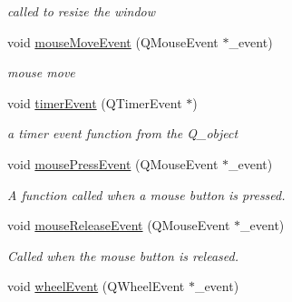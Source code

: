 \begin{DoxyCompactItemize}
\begin{DoxyCompactList}\small\item\em called to resize the window \end{DoxyCompactList}\item 
\hypertarget{class_open_g_l_widget_aa6d543f552c813df3b3a78dc5c4899fd}{void \hyperlink{class_open_g_l_widget_aa6d543f552c813df3b3a78dc5c4899fd}{mouse\-Move\-Event} (Q\-Mouse\-Event $\ast$\-\_\-event)}\label{class_open_g_l_widget_aa6d543f552c813df3b3a78dc5c4899fd}

\begin{DoxyCompactList}\small\item\em mouse move \end{DoxyCompactList}\item 
\hypertarget{class_open_g_l_widget_a11473cec64e843211458fd83f9d6ad72}{void \hyperlink{class_open_g_l_widget_a11473cec64e843211458fd83f9d6ad72}{timer\-Event} (Q\-Timer\-Event $\ast$)}\label{class_open_g_l_widget_a11473cec64e843211458fd83f9d6ad72}

\begin{DoxyCompactList}\small\item\em a timer event function from the Q\-\_\-object \end{DoxyCompactList}\item 
\hypertarget{class_open_g_l_widget_adaab83f0bed689b0765d42b6ae760220}{void \hyperlink{class_open_g_l_widget_adaab83f0bed689b0765d42b6ae760220}{mouse\-Press\-Event} (Q\-Mouse\-Event $\ast$\-\_\-event)}\label{class_open_g_l_widget_adaab83f0bed689b0765d42b6ae760220}

\begin{DoxyCompactList}\small\item\em A function called when a mouse button is pressed. \end{DoxyCompactList}\item 
\hypertarget{class_open_g_l_widget_aa3f5541e5da2d5c52ca16b99f40dfd75}{void \hyperlink{class_open_g_l_widget_aa3f5541e5da2d5c52ca16b99f40dfd75}{mouse\-Release\-Event} (Q\-Mouse\-Event $\ast$\-\_\-event)}\label{class_open_g_l_widget_aa3f5541e5da2d5c52ca16b99f40dfd75}

\begin{DoxyCompactList}\small\item\em Called when the mouse button is released. \end{DoxyCompactList}\item 
\hypertarget{class_open_g_l_widget_a0682546d360b7ce9ae1dce31a090cfca}{void \hyperlink{class_open_g_l_widget_a0682546d360b7ce9ae1dce31a090cfca}{wheel\-Event} (Q\-Wheel\-Event $\ast$\-\_\-event)}\label{class_open_g_l_widget_a0682546d360b7ce9ae1dce31a090cfca}


\end{DoxyCompactItemize}
